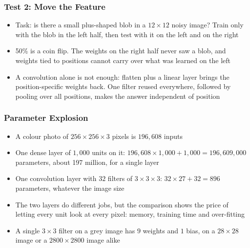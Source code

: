 \begin{frame}[fragile] \frametitle{Test 2: Move the Feature}
\begin{itemize}
\item Task: is there a small plus-shaped blob in a $12 \times 12$ noisy image? Train only with the blob in the left half, then test with it on the left and on the right
\end{itemize}
\begin{center}
\small
{}
\end{center}
\begin{itemize}
\item 50\% is a coin flip. The weights on the right half never saw a blob, and weights tied to positions cannot carry over what was learned on the left
\item A convolution alone is not enough: flatten plus a linear layer brings the position-specific weights back. One filter reused everywhere, followed by pooling over all positions, makes the answer independent of position
\end{itemize}
\end{frame}

\begin{frame}[fragile] \frametitle{Parameter Explosion}
\begin{itemize}
\item A colour photo of $256 \times 256 \times 3$ pixels is $196{,}608$ inputs
\item One dense layer of $1{,}000$ units on it: $196{,}608 \times 1{,}000 + 1{,}000 = 196{,}609{,}000$ parameters, about 197 million, for a single layer
\item One convolution layer with $32$ filters of $3 \times 3 \times 3$: $32 \times 27 + 32 = 896$ parameters, whatever the image size
\item The two layers do different jobs, but the comparison shows the price of letting every unit look at every pixel: memory, training time and over-fitting
\item A single $3 \times 3$ filter on a grey image has $9$ weights and $1$ bias, on a $28 \times 28$ image or a $2800 \times 2800$ image alike
\end{itemize}
\end{frame}

